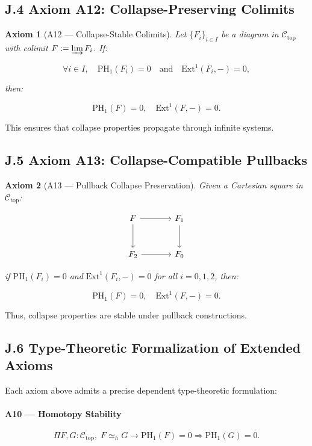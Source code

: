 \documentclass[11pt]{article}
\newtheorem{axiom}{Axiom}[section]
\begin{document}
\subsection*{J.4 Axiom A12: Collapse-Preserving Colimits}

\begin{axiom}[A12 — Collapse-Stable Colimits]
Let \( \{ F_i \}_{i \in I} \) be a diagram in \( \mathcal{C}_{\mathrm{top}} \) with colimit \( F := \varinjlim F_i \). If:

\[
\forall i \in I, \quad \mathrm{PH}_1(F_i) = 0 \quad \text{and} \quad \mathrm{Ext}^1(F_i, -) = 0,
\]

then:

\[
\mathrm{PH}_1(F) = 0, \quad \mathrm{Ext}^1(F, -) = 0.
\]
\end{axiom}

This ensures that collapse properties propagate through infinite systems.

\subsection*{J.5 Axiom A13: Collapse-Compatible Pullbacks}

\begin{axiom}[A13 — Pullback Collapse Preservation]
Given a Cartesian square in \( \mathcal{C}_{\mathrm{top}} \):

\[
\begin{tikzcd}[row sep=large, column sep=large]
F \arrow[r] \arrow[d] & F_1 \arrow[d] \\
F_2 \arrow[r] & F_0
\end{tikzcd}
\]

if \( \mathrm{PH}_1(F_i) = 0 \) and \( \mathrm{Ext}^1(F_i, -) = 0 \) for all \( i = 0, 1, 2 \), then:

\[
\mathrm{PH}_1(F) = 0, \quad \mathrm{Ext}^1(F, -) = 0.
\]
\end{axiom}

Thus, collapse properties are stable under pullback constructions.

\subsection*{J.6 Type-Theoretic Formalization of Extended Axioms}

Each axiom above admits a precise dependent type-theoretic formulation:

\paragraph{A10 — Homotopy Stability}
\[
\Pi F, G : \mathcal{C}_{\mathrm{top}}, \; F \simeq_h G \to \mathrm{PH}_1(F) = 0 \Rightarrow \mathrm{PH}_1(G) = 0.
\]
\end{document}
